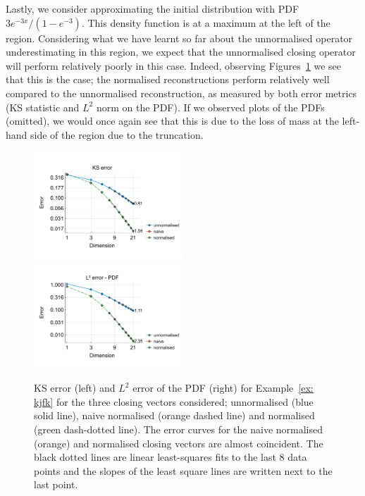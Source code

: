\begin{example}\label{ex: kjfk}
	Lastly, we consider approximating the initial distribution with PDF \(3e^{-3x}/(1-e^{-3})\). This density function is at a maximum at the left of the region. Considering what we have learnt so far about the unnormalised operator underestimating in this region, we expect that the unnormalised closing operator will perform relatively poorly in this case. Indeed, observing Figures~\ref{fig: fun 7 ks error qbdrap closing vecs} we see that this is the case; the normalised reconstructions perform relatively well compared to the unnormalised reconstruction, as measured by both error metrics (KS statistic and \(L^2\) norm on the PDF). If we observed plots of the PDFs (omitted), we would once again see that this is due to the loss of mass at the left-hand side of the region due to the truncation. 
\begin{figure}[h]
	\centering
	\includegraphics[width=0.5\textwidth,trim={0.5cm 0.8cm 0.2cm 1.25cm},clip]{chapter6/figs/qbdrap_closing_vec/fun7/ks_error_formatted.pdf}%
	\includegraphics[width=0.5\textwidth,trim={0.5cm 0.8cm 0.2cm 1.25cm},clip]{chapter6/figs/qbdrap_closing_vec/fun7/l2_pdf_error_formatted.pdf}
	\caption{KS error (left) and \(L^2\) error of the PDF (right) for Example~\ref{ex: kjfk} for the three closing vectors considered; unnormalised (blue solid line), naive normalised (orange dashed line) and normalised (green dash-dotted line). The error curves for the naive normalised (orange) and normalised closing vectors are almost coincident. The black dotted lines are linear least-squares fits to the last 8 data points and the slopes of the least square lines are written next to the last point.}
	\label{fig: fun 7 ks error qbdrap closing vecs}
\end{figure}
\exampleFloatBarrier
\end{example}

